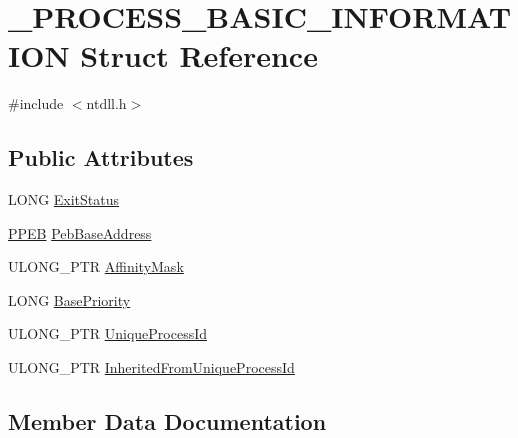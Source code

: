\section{\-\_\-\-P\-R\-O\-C\-E\-S\-S\-\_\-\-B\-A\-S\-I\-C\-\_\-\-I\-N\-F\-O\-R\-M\-A\-T\-I\-O\-N Struct Reference}
\label{struct___p_r_o_c_e_s_s___b_a_s_i_c___i_n_f_o_r_m_a_t_i_o_n}


{\ttfamily \#include $<$ntdll.\-h$>$}

\subsection*{Public Attributes}
\begin{DoxyCompactItemize}
\item 
L\-O\-N\-G \hyperlink{struct___p_r_o_c_e_s_s___b_a_s_i_c___i_n_f_o_r_m_a_t_i_o_n_a158dbd155c8ba715b9227ee2b1d51359}{Exit\-Status}
\item 
\hyperlink{ntdll_8h_a7e2190f300039ae1e9d8ac5e07305664}{P\-P\-E\-B} \hyperlink{struct___p_r_o_c_e_s_s___b_a_s_i_c___i_n_f_o_r_m_a_t_i_o_n_a0e16d6208b60ee422a60c8b02b2ead6b}{Peb\-Base\-Address}
\item 
U\-L\-O\-N\-G\-\_\-\-P\-T\-R \hyperlink{struct___p_r_o_c_e_s_s___b_a_s_i_c___i_n_f_o_r_m_a_t_i_o_n_a20e026bd9c4a44748c1e58be8e01f087}{Affinity\-Mask}
\item 
L\-O\-N\-G \hyperlink{struct___p_r_o_c_e_s_s___b_a_s_i_c___i_n_f_o_r_m_a_t_i_o_n_a9bf4fd57345830ab120e52a36d03c354}{Base\-Priority}
\item 
U\-L\-O\-N\-G\-\_\-\-P\-T\-R \hyperlink{struct___p_r_o_c_e_s_s___b_a_s_i_c___i_n_f_o_r_m_a_t_i_o_n_afe6e56b5ae0aff9044ee218c86f59f2d}{Unique\-Process\-Id}
\item 
U\-L\-O\-N\-G\-\_\-\-P\-T\-R \hyperlink{struct___p_r_o_c_e_s_s___b_a_s_i_c___i_n_f_o_r_m_a_t_i_o_n_a3f8ec42c62876c0498599957a97a4a10}{Inherited\-From\-Unique\-Process\-Id}
\end{DoxyCompactItemize}


\subsection{Member Data Documentation}
